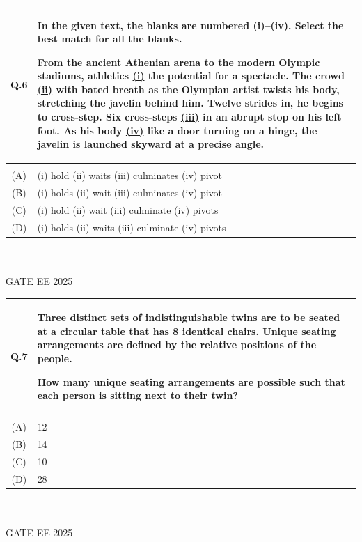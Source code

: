 \documentclass[journal,12pt,onecolumn]{IEEEtran}
\theoremstyle{remark}
\begin{document}
\begin{tabular}{|c|p{16cm}|}\hline
   Q.6 & In the given text, the blanks are numbered (i)–(iv). Select the best match for all the blanks.

\bigskip

From the ancient Athenian arena to the modern Olympic stadiums, athletics \underline{(i)} the potential for a spectacle. The crowd \underline{(ii)} with bated breath as the Olympian artist twists his body, stretching the javelin behind him. Twelve strides in, he begins to cross-step. Six cross-steps \underline{(iii)} in an abrupt stop on his left foot. As his body \underline{(iv)} like a door turning on a hinge, the javelin is launched skyward at a precise angle. \\   \hline
     & \\    \hline
  (A) & (i) hold \quad (ii) waits \quad (iii) culminates \quad (iv) pivot\\     \hline
  (B) & (i) holds \quad (ii) wait \quad (iii) culminates \quad (iv) pivot\\  \hline
  (C) & (i) hold \quad (ii) wait \quad (iii) culminate \quad (iv) pivots\\  \hline
  (D) &  (i) holds \quad (ii) waits \quad (iii) culminate \quad (iv) pivots\\  \hline
\end{tabular} ~\\ \\
GATE EE 2025\\

\begin{tabular}{|c|p{16cm}|}\hline
   Q.7 & Three distinct sets of indistinguishable twins are to be seated at a circular table that has 8 identical chairs. Unique seating arrangements are defined by the relative positions of the people.

\medskip

How many unique seating arrangements are possible such that each person is sitting next to their twin?
 \\   \hline
     & \\    \hline
  (A) & 12\\     \hline
  (B) & 14\\  \hline
  (C) & 10\\  \hline
  (D) & 28\\  \hline
\end{tabular} ~\\ \\
GATE EE 2025\\
\end{document}
